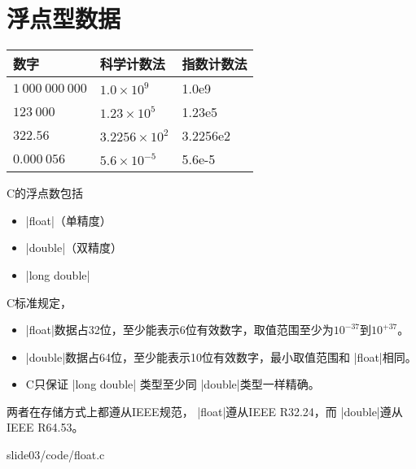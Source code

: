 \section{浮点型数据}

\begin{frame}
\begin{table}
\centering
\begin{tabular}{lll} \hline
数字&科学计数法&指数计数法\\\hline
$1~000~000~000$ & $1.0\times 10^9$ & 1.0e9\\ 
$123~000$ & $1.23\times10^5$ & 1.23e5\\
$322.56$ & $3.2256\times10^2$ & 3.2256e2\\
$0.000~056$ & $5.6\times10^{-5}$ & 5.6e-5\\\hline
\end{tabular}
\end{table}
\end{frame}


\begin{frame}
  C的浮点数包括
  \begin{itemize}
  \item \lst|float|（单精度）
  \item \lst|double|（双精度）
  \item \lst|long double| 
  \end{itemize}

\end{frame}
% 
%
\begin{frame}

C标准规定，
\begin{itemize}
\item  \lst|float|数据占32位，至少能表示6位有效数字，取值范围至少为$10^{-37}$到$10^{+37}$。
\item  \lst|double|数据占64位，至少能表示10位有效数字，最小取值范围和 \lst|float|相同。
\item C只保证 \lst|long double| 类型至少同 \lst|double|类型一样精确。
\end{itemize}
\vspace{0.1in}

两者在存储方式上都遵从IEEE规范， \lst|float|遵从IEEE R32.24，而 \lst|double|遵从IEEE R64.53。
\end{frame}

\begin{frame}[fragile]{\secname}
  
  {slide03/code/float.c} 
\end{frame}

